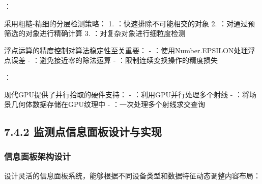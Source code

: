 ：


采用粗糙-精细的分层检测策略： 1. ：快速排除不可能相交的对象 2. ：对通过预筛选的对象进行精确计算 3. ：对复杂对象进行细粒度检测


浮点运算的精度控制对算法稳定性至关重要： - ：使用Number.EPSILON处理浮点误差 - ：避免接近零的除法运算 - ：限制连续变换操作的精度损失

：


现代GPU提供了并行拾取的硬件支持： - ：利用GPU并行处理多个射线 - ：将场景几何体数据存储在GPU纹理中 - ：一次处理多个射线求交查询

\hypertarget{ux76d1ux6d4bux70b9ux4fe1ux606fux9762ux677fux8bbeux8ba1ux4e0eux5b9eux73b0}{%
\subsection{7.4.2 监测点信息面板设计与实现}\label{ux76d1ux6d4bux70b9ux4fe1ux606fux9762ux677fux8bbeux8ba1ux4e0eux5b9eux73b0}}

\hypertarget{ux4fe1ux606fux9762ux677fux67b6ux6784ux8bbeux8ba1}{%
\subsubsection{信息面板架构设计}\label{ux4fe1ux606fux9762ux677fux67b6ux6784ux8bbeux8ba1}}


设计灵活的信息面板系统，能够根据不同设备类型和数据特征动态调整内容布局：

